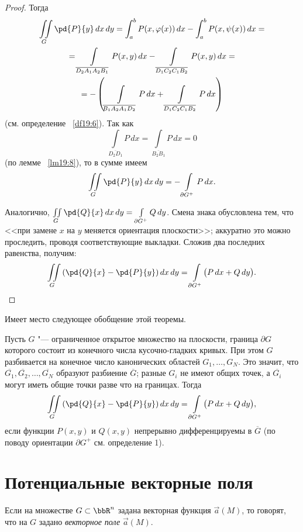 \begin{proof}
Тогда
\begin{multline*}
\iint\limits_G \pd{P}{y}\,dx\,dy = \int_a^b P(x,\varphi(x))\,dx - \int_a^b P(x,\psi(x))\,dx = \\
= \int\limits_{\overline{D_2 A_1 A_2 B_1}} P(x,y)\,dx - \int\limits_{\overline{D_1 C_2 C_1 B_2}} P(x,y)\,dx = \\
= -\left( \int\limits_{\overline{B_1 A_2 A_1 D_2}} P\,dx + \int\limits_{\overline{D_1 C_2 C_1 B_2}} P\,dx \right)
\end{multline*}
(см. определение ~\ref{df19:6}). Так как
$$
\int\limits_{\overline{D_2 D_1}} P\,dx = \int\limits_{\overline{B_2 B_1}} P\,dx = 0
$$
(по лемме ~\ref{lm19:8}), то в сумме имеем
$$
\iint\limits_G \pd{P}{y}\,dx\,dy = -\int\limits_{\partial G^+} P\,dx.
$$

Аналогично, $\iint\limits_G \pd{Q}{x}\,dx\,dy = \int\limits_{\partial G^+} Q\,dy$. Смена знака обусловлена тем, что <<при замене $x$ на $y$ меняется ориентация плоскости>>; аккуратно это можно проследить, проводя соответствующие выкладки. Сложив два последних равенства, получим:
$$
\iint\limits_G \left( \pd{Q}{x} - \pd{P}{y} \right) dx\,dy = \int\limits_{\partial G^+} \bigl( P\,dx + Q\,dy \bigr).
$$
\end{proof}

Имеет место следующее обобщение этой теоремы.

\begin{thm}
Пусть $G$ "--- ограниченное открытое множество на плоскости, граница $\partial G$ которого состоит из конечного числа кусочно-гладких кривых. При этом $G$ разбивается на конечное число канонических областей $G_1, \ldots, G_N$. Это значит, что $\overline{G_1}, \overline{G_2}, \ldots, \overline{G_N}$ образуют разбиение $\overline{G}$; разные $G_i$ не имеют общих точек, а $\overline{G_i}$ могут иметь общие точки разве что на границах. Тогда
$$
\iint\limits_G \left( \pd{Q}{x} - \pd{P}{y} \right) dx\,dy = \int\limits_{\partial G^+} \bigl( P\,dx + Q\,dy \bigr),
$$
если функции $P(x,y)$ и $Q(x,y)$ непрерывно дифференцируемы в $\overline{G}$ (по поводу ориентации $\partial G^+$ см. определение 1).
\end{thm}


\section{Потенциальные векторные поля}

Если на множестве $G \subset \bbR^n$ задана векторная функция $\vec{a}(M)$, то говорят, что на $G$ задано \textit{векторное поле} $\vec{a}(M)$.

